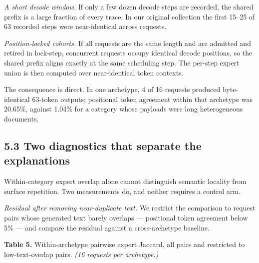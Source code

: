 \documentclass[
  10pt,
  letterpaper,
  10pt]{article}
\begin{document}
\emph{A short decode window.} If only a few dozen decode steps are
recorded, the shared prefix is a large fraction of every trace. In our
original collection the first 15--25 of 63 recorded steps were
near-identical across requests.

\emph{Position-locked cohorts.} If all requests are the same length and
are admitted and retired in lock-step, concurrent requests occupy
identical decode positions, so the shared prefix aligns exactly at the
same scheduling step. The per-step expert union is then computed over
near-identical token contexts.

The consequence is direct. In one archetype, 4 of 16 requests produced
byte-identical 63-token outputs; positional token agreement within that
archetype was 20.65\%, against 1.04\% for a category whose payloads were
long heterogeneous documents.

\subsection{5.3 Two diagnostics that separate the
explanations}\label{two-diagnostics-that-separate-the-explanations}

Within-category expert overlap alone cannot distinguish semantic
locality from surface repetition. Two measurements do, and neither
requires a control arm.

\emph{Residual after removing near-duplicate text.} We restrict the
comparison to request pairs whose generated text barely overlaps ---
positional token agreement below 5\% --- and compare the residual
against a cross-archetype baseline.

\textbf{Table 5.} Within-archetype pairwise expert Jaccard, all pairs
and restricted to low-text-overlap pairs. \emph{(16 requests per
archetype.)}
\end{document}
